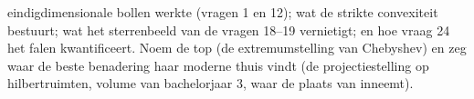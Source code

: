 \begin{problem}
\begin{enumerate}[resume]
        eindigdimensionale bollen werkte (vragen 1 en 12); wat de
        strikte convexiteit bestuurt; wat het sterrenbeeld van de
        vragen 18--19 vernietigt; en hoe vraag 24 het falen
        kwantificeert. Noem de top (de extremumstelling van
        Chebyshev) en zeg waar de beste benadering haar moderne
        thuis vindt (de projectiestelling op hilbertruimten, volume
        van bachelorjaar 3, waar  de plaats van
         inneemt).
\end{enumerate}
\end{problem}
